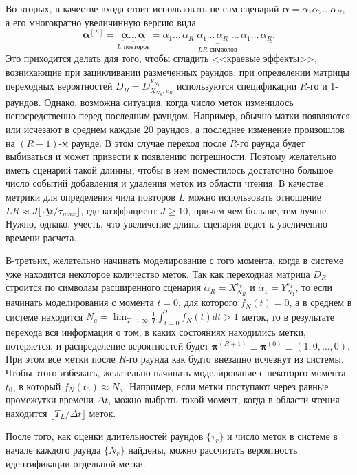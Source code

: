 Во-вторых, в качестве входа стоит использовать не сам сценарий $\bm{\alpha} = \alpha_1 \alpha_2 \dots \alpha_R$, а его многократно увеличинную версию вида
$$
	\bm{\alpha}^{[L]} = \underbrace{\bm{\alpha} \dots\, \bm{\alpha}}_{L \text{ повторов}} =
		\underbrace{\alpha_1 \dots\, \alpha_R \; \alpha_1 \dots\, \alpha_R\; \dots \, \alpha_1 \dots\, \alpha_R}_{LR \text{ символов}}.
$$
Это приходится делать для того, чтобы сгладить <<краевые эффекты>>, возникающие при зацикливании размеченных раундов: при определении матрицы переходных вероятностей $D_R = D_{X_{N_{R}},e_R}^{Y_{N_1}}$ используются спецификации $R$-го и 1-раундов. Однако, возможна ситуация, когда число меток изменилось непосредственно перед последним раундом. Например, обычно матки появляются или исчезают в среднем каждые 20 раундов, а последнее изменение произошлов на $(R-1)$-м раунде. В этом случае переход после $R$-го раунда будет выбиваться и может привести к появлению погрешности. Поэтому желательно иметь сценарий такой длинны, чтобы в нем поместилось достаточно большое число событий добавления и удаления меток из области чтения. В качестве метрики для определения чила повторов $L$ можно использовать отношение $LR \approx J \lfloor \underline{\Delta t} / \tau_{max} \rfloor$, где коэффициент $J \geqslant 10$, причем чем больше, тем лучше. Нужно, однако, учесть, что увеличение длины сценария ведет к увеличению времени расчета.

В-третьих, желательно начинать моделирование с того момента, когда в системе уже находится некоторое количество меток. Так как переходная матрица $D_R$ строится по символам расширенного сценария $\widetilde{\alpha}_R = X_{N_R}^{e_r}$ и $\widetilde{\alpha}_1 = Y_{N_1}^{e_1}$, то если начинать моделирования с момента $t = 0$, для которого $f_N(t) = 0$, а в среднем в системе находится $N_a = \lim_{T \rightarrow \infty} \frac{1}{T} \int_{t=0}^{T} f_N(t) dt > 1$ меток, то в результате перехода вся информация о том, в каких состояниях находились метки, потеряется, и распределение вероятностей будет $\bm{\pi}^{(R+1)} \equiv \bm{\pi}^{(0)} \equiv (1, 0, \dots, 0)$. При этом все метки после $R$-го раунда как будто внезапно исчезнут из системы. Чтобы этого избежать, желательно начинать моделирование с некоторго момента $t_0$, в который $f_N(t_0) \approx N_a$. Например, если метки поступают через равные промежутки времени $\Delta t$, можно выбрать такой момент, когда в области чтения находится $\lfloor T_L / \Delta t \rfloor$ меток.

После того, как оценки длительностей раундов $\{ \tau_r \}$ и число меток в системе в начале каждого раунда $\{ N_r \}$ найдены, можно рассчитать вероятность идентификации отдельной метки.






